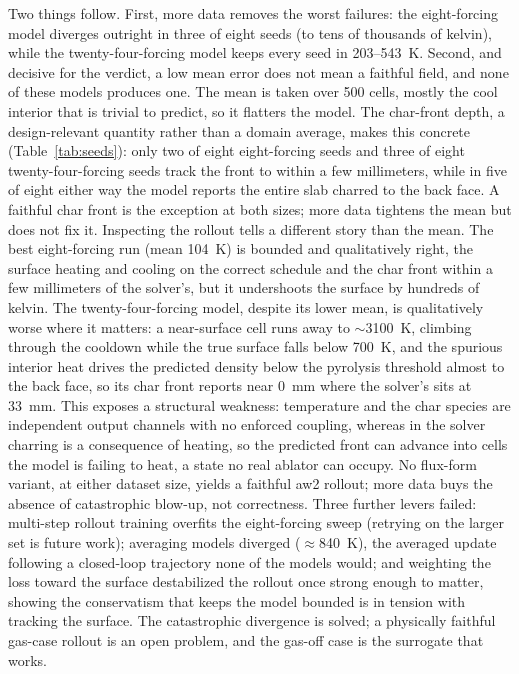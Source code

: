 \documentclass[conference]{IEEEtran}
\begin{document}
Two things follow. First, more data removes the worst failures: the eight-forcing
model diverges outright in three of eight seeds (to tens of thousands of kelvin),
while the twenty-four-forcing model keeps every seed in 203--543~K. Second, and
decisive for the verdict, a low mean error does not mean a faithful field, and
none of these models produces one. The mean is taken over 500 cells, mostly the
cool interior that is trivial to predict, so it flatters the model. The
char-front depth, a design-relevant quantity rather than a domain average, makes
this concrete (Table~\ref{tab:seeds}): only two of eight eight-forcing seeds and
three of eight twenty-four-forcing seeds track the front to within a few
millimeters, while in five of eight either way the model reports the entire slab
charred to the back face. A faithful char front is the exception at both sizes;
more data tightens the mean but does not fix it. Inspecting the rollout tells a
different story than the mean. The best eight-forcing run (mean
104~K) is bounded and qualitatively right, the surface heating and cooling on the
correct schedule and the char front within a few millimeters of the solver's, but
it undershoots the surface by hundreds of kelvin. The twenty-four-forcing model,
despite its lower mean, is qualitatively worse where it matters: a near-surface
cell runs away to $\sim$3100~K, climbing through the cooldown while the true
surface falls below 700~K, and the spurious interior heat drives the predicted
density below the pyrolysis threshold almost to the back face, so its char front
reports near 0~mm where the solver's sits at 33~mm. This exposes a structural
weakness: temperature and the char species are independent output channels with
no enforced coupling, whereas in the solver charring is a consequence of heating,
so the predicted front can advance into cells the model is failing to heat, a
state no real ablator can occupy. No flux-form variant, at
either dataset size, yields a faithful aw2 rollout; more data buys the absence of
catastrophic blow-up, not correctness. Three further levers failed: multi-step
rollout training overfits the eight-forcing sweep (retrying on the larger set is
future work); averaging models diverged ($\approx$840~K), the averaged update
following a closed-loop trajectory none of the models would; and weighting the
loss toward the surface destabilized the rollout once strong enough to matter,
showing the conservatism that keeps the model bounded is in tension with tracking
the surface. The catastrophic divergence is solved; a physically faithful gas-case
rollout is an open problem, and the gas-off case is the surrogate that works.
\end{document}
